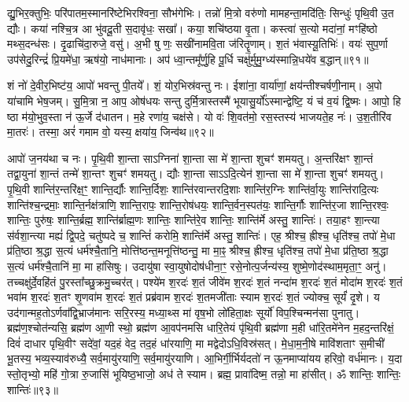 द्यु॒भिर॒क्तुभिः॒ परि॑पातम॒स्मानरि॑ष्टेभिरश्विना॒ सौभ॑गेभिः। 
तन्नो॑ मि॒त्रो वरु॑णो मामहन्ता॒मदि॑तिः॒ सिन्धुः॑ पृथि॒वी उ॒त द्यौः। 
कया॑ नश्चि॒त्र आ भु॑वदू॒ती स॒दावृ॑धः॒ सखा᳚। 
कया॒ शचि॑ष्ठया वृ॒ता। 
कस्त्वा॑ स॒त्यो मदा॑नां॒ मꣳहि॑ष्ठो मथ्स॒दन्ध॑सः। 
दृ॒ढाचि॑दा॒रुजे॒ वसु॑। 
अ॒भी षु णः॒ सखी॑नामवि॒ता ज॑रितॄ॒णाम्। 
श॒तं भ॑वास्यू॒तिभिः॑। 
वयः॑ सुप॒र्णा उप॑सेदु॒रिन्द्रं॑ प्रि॒यमे॑धा॒ ऋष॑यो॒ नाध॑मानाः। 
अप॑ ध्वा॒न्तमू᳚र्णु॒हि पू॒र्धि चक्षु॑र्मुमु॒ग्ध्य॑स्मान्नि॒धये॑व ब॒द्धान्॥९१॥

शं नो॑ दे॒वीर॒भिष्ट॑य॒ आपो॑ भवन्तु पी॒तये᳚। 
शं॒ योर॒भिस्र॑वन्तु नः। 
ईशा॑ना॒ वार्या॑णां॒ क्षय॑न्तीश्चर्\mbox{}षणी॒नाम्। 
अ॒पो या॑चामि भेष॒जम्। 
सु॒मि॒त्रा न॒ आप॒ ओष॑धयः सन्तु दुर्मि॒त्रास्तस्मै॑ भूयासु॒र्यो᳚ऽस्मान्द्वेष्टि॒ यं च॑ व॒यं द्वि॒ष्मः। 
आपो॒ हि ष्ठा म॑यो॒भुव॒स्ता न॑ ऊ॒र्जे द॑धातन। 
म॒हे रणा॑य॒ चक्ष॑से। 
यो वः॑ शि॒वत॑मो॒ रस॒स्तस्य॑ भाजयते॒ह नः॑। 
उ॒श॒तीरि॑व मा॒तरः॑। 
तस्मा॒ अरं॑ गमाम वो॒ यस्य॒ क्षया॑य॒ जिन्व॑थ॥९२॥

आपो॑ ज॒नय॑था च नः। 
पृ॒थि॒वी शा॒न्ता साऽग्निना॑ शा॒न्ता सा मे॑ शा॒न्ता शुचꣳ॑ शमयतु। 
अ॒न्तरि॑क्षꣳ शा॒न्तं तद्वा॒युना॑ शा॒न्तं तन्मे॑ शा॒न्तꣳ शुचꣳ॑ शमयतु। 
द्यौः  शा॒न्ता साऽऽदि॒त्येन॑ शा॒न्ता सा मे॑ शा॒न्ता शुचꣳ॑ शमयतु। 
पृ॒थि॒वी शान्ति॑र॒न्तरि॑क्ष॒ꣳ॒ शान्ति॒र्द्यौः  शान्ति॒र्दिशः॒ शान्ति॑रवान्तरदि॒शाः  शान्ति॑र॒ग्निः  शान्ति॑र्वा॒युः  शान्ति॑रादि॒त्यः  शान्ति॑श्च॒न्द्रमाः॒ शान्ति॒र्नक्ष॑त्राणि॒ शान्ति॒रापः॒ शान्ति॒रोष॑धयः॒ शान्ति॒र्वन॒स्पत॑यः॒ शान्ति॒र्गौः  शान्ति॑र॒जा शान्ति॒रश्वः॒ शान्तिः॒ पुरु॑षः॒ शान्ति॒र्ब्रह्म॒ शान्ति॑र्ब्राह्म॒णः  शान्तिः॒ शान्ति॑रे॒व शान्तिः॒ शान्ति॑र्मे अस्तु॒ शान्तिः॑। 
तया॒हꣳ शा॒न्त्या स॑र्वशा॒न्त्या मह्यं॑ द्वि॒पदे॒ चतु॑ष्पदे च॒ शान्तिं॑ करोमि॒ शान्ति॑र्मे अस्तु॒ शान्तिः॑। 
एह॒ श्रीश्च॒ ह्रीश्च॒ धृति॑श्च॒ तपो॑ मे॒धा प्र॑ति॒ष्ठा श्र॒द्धा स॒त्यं धर्म॑श्चै॒तानि॒ मोत्ति॑ष्ठन्त॒मनूत्ति॑ष्ठन्तु॒ मा मा॒ꣴ॒ श्रीश्च॒ ह्रीश्च॒ धृति॑श्च॒ तपो॑ मे॒धा प्र॑ति॒ष्ठा श्र॒द्धा स॒त्यं धर्म॑श्चै॒तानि॑ मा॒ मा हा॑सिषुः। 
उदायु॑षा स्वा॒युषोदोष॑धीना॒ꣳ॒ रसे॒नोत्प॒र्जन्य॑स्य॒ शुष्मे॒णोद॑स्थाम॒मृता॒ꣳ॒ अनु॑। 
तच्चक्षु॑र्दे॒वहि॑तं पु॒रस्ता᳚च्छु॒क्रमु॒च्चर॑त्। 
पश्ये॑म श॒रदः॑ श॒तं जीवे॑म श॒रदः॑ श॒तं नन्दा॑म श॒रदः॑ श॒तं मोदा॑म श॒रदः॑ श॒तं भवा॑म श॒रदः॑ श॒तꣳ शृ॒णवा॑म श॒रदः॑ श॒तं प्रब्र॑वाम श॒रदः॑ श॒तमजी॑ताः स्याम श॒रदः॑ श॒तं ज्योक्च॒ सूर्यं॑ दृ॒शे। 
य उद॑गान्मह॒तोऽर्णवा᳚द्वि॒भ्राज॑मानः सरि॒रस्य॒ मध्या॒थ्स मा॑ वृष॒भो लो॑हिता॒क्षः सूर्यो॑ विप॒श्चिन्मन॑सा पुनातु। 
ब्रह्म॑ण॒श्चोत॑न्यसि॒ ब्रह्म॑ण आ॒णी स्थो॒ ब्रह्म॑ण आ॒वप॑नमसि धारि॒तेयं पृ॑थि॒वी ब्रह्म॑णा म॒ही धा॑रि॒तमे॑नेन म॒हद॒न्तरि॑क्षं॒ दिवं॑ दाधार पृथि॒वीꣳ सदे॑वां॒ यद॒हं वेद॒ तद॒हं धा॑रयाणि॒ मा मद्वेदोऽधि॒विस्र॑सत्। 
मे॒धा॒म॒नी॒षे मावि॑शताꣳ स॒मीची॑ भू॒तस्य॒ भव्य॒स्याव॑रुध्यै॒ सर्व॒मायु॑रयाणि॒ सर्व॒मायु॑रयाणि। 
आ॒भिर्गी॒र्भिर्यदतो॑ न ऊ॒नमाप्या॑यय हरिवो॒ वर्ध॑मानः। 
य॒दा स्तो॒तृभ्यो॒ महि॑ गो॒त्रा रु॒जासि॑ भूयिष्ठ॒भाजो॒ अध॑ ते स्याम। 
ब्रह्म॒ प्रावा॑दिष्म॒ तन्नो॒ मा हा॑सीत्। 
ॐ शान्तिः॒ शान्तिः॒ शान्तिः॑॥९३॥\anuvakamend[प॒रा॒वतो॑ दधातु ब॒द्धां जिन्व॑थ दृ॒शे स॒प्त च॑]

